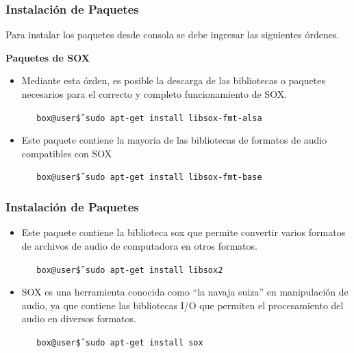 \begin{frame}
\frametitle{Instalación de Paquetes}

Para instalar los paquetes desde consola se debe ingresar las siguientes órdenes.

\textbf{Paquetes de SOX}
\begin{itemize}
 
    \item  Mediante esta órden, es posible la descarga de las bibliotecas o paquetes necesarios para el correcto y completo funcionamiento de SOX.
    \begin{block}{}
    \texttt 
    {\ \ \ box@user\~\$ sudo apt-get install libsox-fmt-alsa}
    \end{block}
    
    \item{Este paquete contiene la mayoría de las bibliotecas de formatos de audio compatibles con SOX
    \begin{block}{}
    \texttt
    {\ \ \ box@user\~\$ sudo apt-get install libsox-fmt-base}
    \end{block}}
\end{itemize}

\end{frame}

\begin{frame}
\frametitle{Instalación de Paquetes}

\begin{itemize}
    \item {Este paquete contiene la biblioteca sox que permite convertir varios formatos de archivos de audio de computadora en otros formatos.
    \begin{block}{}
    \texttt
    {\ \ \ box@user\~\$ sudo apt-get install libsox2}
    \end{block}}
    
    \item{SOX es una herramienta conocida como “la navaja suiza” en manipulación de audio, ya que contiene las bibliotecas I/O que permiten el procesamiento del audio en diversos formatos.
    \begin{block}{}
    \texttt
    {\ \ \ box@user\~\$ sudo apt-get install sox}
    \end{block}}
\end{itemize}

\end{frame}

